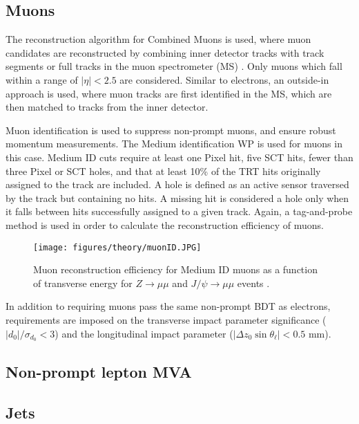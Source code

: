 \subsection{Muons}
\label{obj:muon}
                   
The reconstruction algorithm for Combined Muons is used, where muon candidates are reconstructed by combining inner detector tracks with track segments or full tracks in the muon spectrometer (MS) \cite{PERF-2014-05}. Only muons which fall within a range of $|\eta| < 2.5$ are considered. Similar to electrons, an outside-in approach is used, where muon tracks are first identified in the MS, which are then matched to tracks from the inner detector. %

Muon identification is used to suppress non-prompt muons, and ensure robust momentum measurements. The Medium identification WP is used for muons in this case. Medium ID cuts require at least one Pixel hit, five SCT hits, fewer than three Pixel or SCT holes, and that at least 10\% of the TRT hits originally assigned to the track are included. A hole is defined as an active sensor traversed by the track but containing no hits. A missing hit is considered a hole only when it falls between hits successfully assigned to a given track. Again, a tag-and-probe method is used in order to calculate the reconstruction efficiency of muons.

\begin{figure}[H]
\centering
   \texttt{[image: figures/theory/muonID.JPG]}
\caption{Muon reconstruction efficiency for Medium ID muons as a function of transverse energy for $Z\rightarrow \mu\mu$ and $J/\psi\rightarrow\mu\mu$ events \cite{PERF-2014-05}.}
\label{fig:eEffEt}
\end{figure}

In addition to requiring muons pass the same non-prompt BDT as electrons, requirements are imposed on the transverse impact parameter significance ($|d_0|/\sigma_{d_0}<3$) and the longitudinal impact parameter ($|\Delta z_0 \sin \theta_\ell|<0.5$ mm).
 
\subsection{Non-prompt lepton MVA}
\label{sec:lepMVA}


\subsection{Jets}
\label{subsec:jets}

